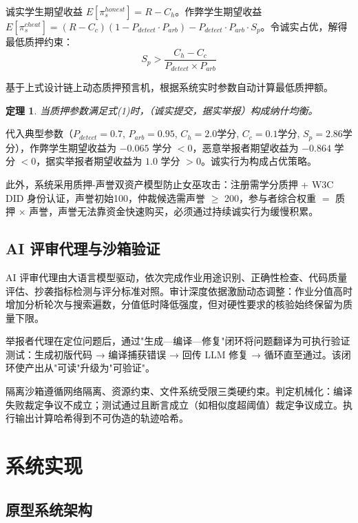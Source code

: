 \documentclass[10pt,twocolumn]{ctexart}
\newtheorem{theorem}{定理}
\begin{document}
诚实学生期望收益 $E[\pi_s^{honest}] = R - C_h$。作弊学生期望收益 $E[\pi_s^{cheat}] = (R - C_c)(1 - P_{detect} \cdot P_{arb}) - P_{detect} \cdot P_{arb} \cdot S_p$。令诚实占优，解得最低质押约束：
\begin{equation}
S_p > \frac{C_h - C_c}{P_{detect} \times P_{arb}}
\end{equation}

基于上式设计链上动态质押预言机，根据系统实时参数自动计算最低质押额。

\begin{theorem}
当质押参数满足式(1)时，（诚实提交，据实举报）构成纳什均衡。
\end{theorem}

代入典型参数（$P_{detect}=0.7$, $P_{arb}=0.95$, $C_h=2.0$学分, $C_c=0.1$学分, $S_p=2.86$学分），作弊学生期望收益为 $-0.065$ 学分 $< 0$，恶意举报者期望收益为 $-0.864$ 学分 $< 0$，据实举报者期望收益为 $1.0$ 学分 $> 0$。诚实行为构成占优策略。

此外，系统采用质押-声誉双资产模型防止女巫攻击：注册需学分质押 + W3C DID 身份认证，声誉初始100，仲裁候选需声誉 $\geq$ 200，参与者综合权重 $=$ 质押 $\times$ 声誉，声誉无法靠资金快速购买，必须通过持续诚实行为缓慢积累。

\subsection{AI 评审代理与沙箱验证}

AI 评审代理由大语言模型驱动，依次完成作业用途识别、正确性检查、代码质量评估、抄袭指标检测与评分标准对照。审计深度依据激励动态调整：作业分值高时增加分析轮次与搜索遍数，分值低时降低强度，但对硬性要求的核验始终保留为质量下限。

举报者代理在定位问题后，通过"生成—编译—修复"闭环将问题翻译为可执行验证测试：生成初版代码 → 编译捕获错误 → 回传 LLM 修复 → 循环直至通过。该闭环使产出从"可读"升级为"可验证"。

隔离沙箱遵循网络隔离、资源约束、文件系统受限三类硬约束。判定机械化：编译失败裁定争议不成立；测试通过且断言成立（如相似度超阈值）裁定争议成立。执行输出计算哈希得到不可伪造的轨迹哈希。

\section{系统实现}

\subsection{原型系统架构}
\end{document}
